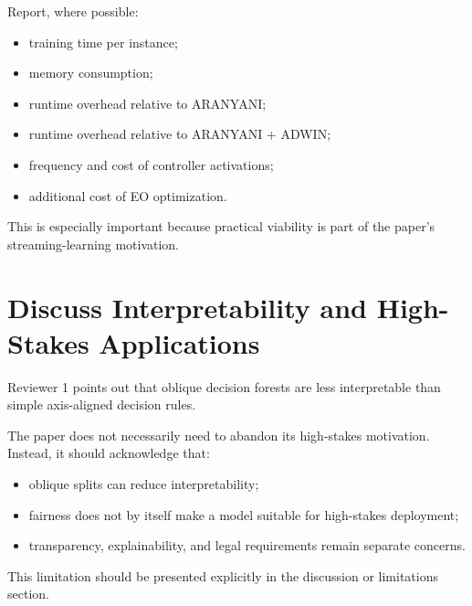 \documentclass[11pt,a4paper]{article}
\begin{document}
Report, where possible:
\begin{itemize}[leftmargin=*]
  \item training time per instance;
  \item memory consumption;
  \item runtime overhead relative to ARANYANI;
  \item runtime overhead relative to ARANYANI + ADWIN;
  \item frequency and cost of controller activations;
  \item additional cost of EO optimization.
\end{itemize}

This is especially important because practical viability is part of
the paper's streaming-learning motivation.

\section{Discuss Interpretability and High-Stakes Applications}

Reviewer 1 points out that oblique decision forests are less
interpretable than simple axis-aligned decision rules.

The paper does not necessarily need to abandon its high-stakes
motivation. Instead, it should acknowledge that:
\begin{itemize}[leftmargin=*]
  \item oblique splits can reduce interpretability;
  \item fairness does not by itself make a model suitable for
    high-stakes deployment;
  \item transparency, explainability, and legal requirements remain
    separate concerns.
\end{itemize}

This limitation should be presented explicitly in the discussion or
limitations section.
\end{document}
